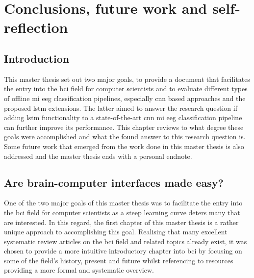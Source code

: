 \chapter{Conclusions, future work and self-reflection}
\label{ch:discussion}

\section{Introduction}
\label{sec:discussion_introduction}

This master thesis set out two major goals, to provide a document that facilitates the entry into the \gls{bci} field for computer scientists and to evaluate different types of offline \gls{mi} \gls{eeg} classification pipelines, especially \gls{cnn} based approaches and the proposed \gls{lstm} extensions.
The latter aimed to answer the research question if adding \gls{lstm} functionality to a state-of-the-art \gls{cnn} \gls{mi} \gls{eeg} classification pipeline can further improve its performance.
This chapter reviews to what degree these goals were accomplished and what the found answer to this research question is.
Some future work that emerged from the work done in this master thesis is also addressed and the master thesis ends with a personal endnote. 


\section{Are brain-computer interfaces made easy?}
\label{sec:discussion_are_bci_easy}

One of the two major goals of this master thesis was to facilitate the entry into the \gls{bci} field for computer scientists as a steep learning curve deters many that are interested.
In this regard, the first chapter of this master thesis is a rather unique approach to accomplishing this goal.
Realising that many excellent systematic review articles on the \gls{bci} field and related topics already exist, it was chosen to provide a more intuitive introductory chapter into \gls{bci} by focusing on some of the field's history, present and future whilst referencing to resources providing a more formal and systematic overview.

